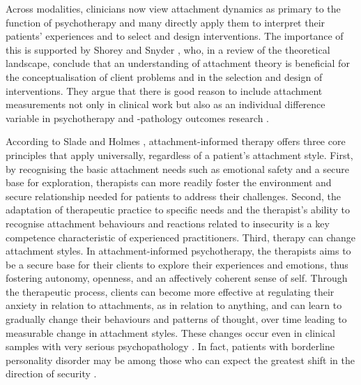 \documentclass[12pt]{report}
\begin{document}
Across modalities, clinicians now view attachment dynamics as primary to the function of psychotherapy and many directly apply them to interpret their patients' experiences and to select and design interventions.
The importance of this is supported by Shorey and Snyder \citeyear{Shorey2006}, who, in a review of the theoretical landscape, conclude that an understanding of attachment theory is beneficial for the conceptualisation of client problems and in the selection and design of interventions.
They argue that there is good reason to include attachment measurements not only in clinical work but also as an individual difference variable in psychotherapy and -pathology outcomes research \cite{Shorey2006}.

According to Slade and Holmes \citeyear{Slade2019}, attachment-informed therapy offers three core principles that apply universally, regardless of a patient's attachment style.
First, by recognising the basic attachment needs such as emotional safety and a secure base for exploration, therapists can more readily foster the environment and secure relationship needed for patients to address their challenges.
Second, the adaptation of therapeutic practice to specific needs and the therapist's ability to recognise attachment behaviours and reactions related to insecurity is a key competence characteristic of experienced practitioners.
Third, therapy can change attachment styles. In attachment-informed psychotherapy, the therapists aims to be a secure base for their clients to explore their experiences and emotions, thus fostering autonomy, openness, and an affectively coherent sense of self.
Through the therapeutic process, clients can become more effective at regulating their anxiety in relation to attachments, as in relation to anything, and can learn to gradually change their behaviours and patterns of thought, over time leading to measurable change in attachment styles.
These changes occur even in clinical samples with very serious psychopathology \cite{Fonagy1996}.
In fact, patients with borderline personality disorder may be among those who can expect the greatest shift in the direction of security \cite{Levy2006, Stovall2003}.
\end{document}
